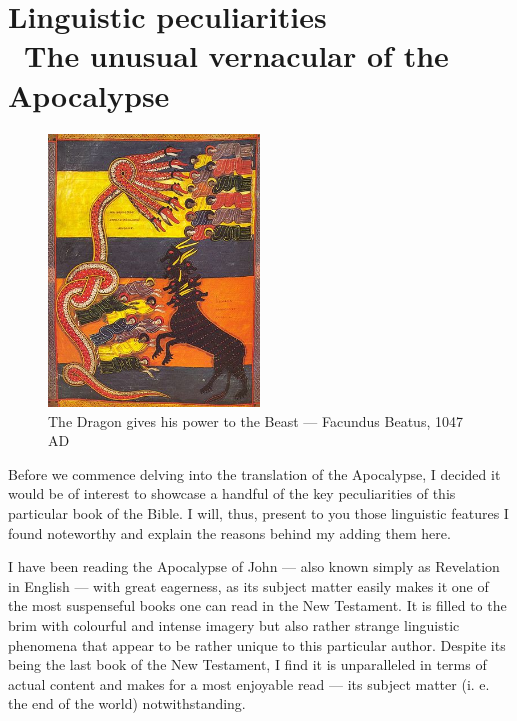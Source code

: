 \chapter*{Linguistic peculiarities \\ \large The unusual vernacular of the Apocalypse}
  
\begin{figure}
	\centering
	\includegraphics[width=0.5\textwidth]{images/linguisticpeculiarities/dragonsevenheads.jpg}
	\small\caption{The Dragon gives his power to the Beast — Facundus Beatus, 1047 AD}
\end{figure} 

Before we commence delving into the translation of the Apocalypse, I decided it would be of interest to showcase a handful of the key peculiarities of this particular book of the Bible. I will, thus, present to you those linguistic features I found noteworthy and explain the reasons behind my adding them here. 

I have been reading the Apocalypse of John — also known simply as Revelation in English — with great eagerness, as its subject matter easily makes it one of the most suspenseful books one can read in the New Testament. It is filled to the brim with colourful and intense imagery but also rather strange linguistic phenomena that appear to be rather unique to this particular author. Despite its being the last book of the New Testament, I find it is unparalleled in terms of actual content and makes for a most enjoyable read — its subject matter (i. e. the end of the world) notwithstanding.


